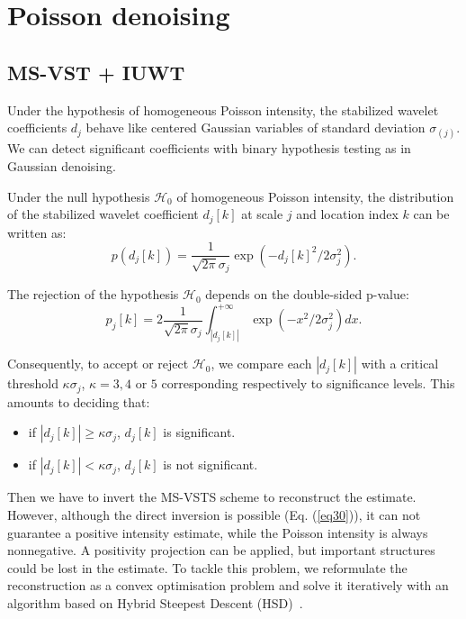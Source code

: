 \chapter{Poisson denoising}
\label{ch_denoising}


\section{MS-VST + IUWT}

Under the hypothesis of homogeneous Poisson intensity, the stabilized wavelet coefficients $d_j$ behave like centered Gaussian variables of standard deviation $\sigma_{(j)}$. We can detect significant coefficients with binary hypothesis testing as in Gaussian denoising.

Under the null hypothesis $\mathcal{H}_0$ of homogeneous Poisson intensity, the distribution of the stabilized wavelet coefficient $d_j[k]$ at scale $j$ and location index $k$ can be written as:
\begin{equation}
\label{ }
p(d_j[k]) = \frac{1}{\sqrt{2\pi}\sigma_j}\exp(-d_j[k]^2 / 2 \sigma_j^2) .
\end{equation}

The rejection of the hypothesis $\mathcal{H}_0$ depends on the double-sided p-value:
\begin{equation}
\label{ }
p_j[k] = 2 \frac{1}{\sqrt{2\pi}\sigma_j}\int_{|d_j[k]|}^{+\infty} \exp(-x^2 / 2 \sigma_j^2) dx .
\end{equation}

Consequently, to accept or reject $\mathcal{H}_0$, we compare each $|d_j[k]|$ with a critical threshold $\kappa \sigma_j$, $\kappa= 3,4 \text{ or } 5$ corresponding respectively to significance levels. This amounts to deciding that:
\begin{itemize}
  \item if $|d_j[k]| \geqslant  \kappa \sigma_j$, $d_j[k]$ is significant.
  \item if $|d_j[k]| < \kappa \sigma_j$, $d_j[k]$ is not significant.
\end{itemize}

Then we have to invert the MS-VSTS scheme to reconstruct the estimate. However, although the direct inversion is possible (Eq. (\ref{eq30})), it can not guarantee a positive intensity estimate, while the Poisson intensity is always nonnegative. A positivity projection can be applied, but important structures could be lost in the estimate. To tackle this problem, we reformulate the reconstruction as a convex optimisation problem and solve it iteratively with an algorithm based on Hybrid Steepest Descent (HSD)~\citep{wave:yamada01}.

